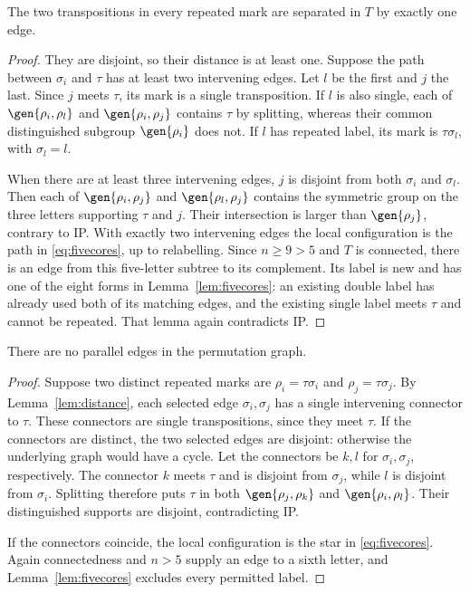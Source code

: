 \begin{lemma}\label{lem:distance}
The two transpositions in every repeated mark are separated in $T$ by
exactly one edge.
\end{lemma}
\begin{proof}
They are disjoint, so their distance is at least one. Suppose the path
between $\sigma_i$ and $\tau$ has at least two intervening edges.
Let $l$ be the first and $j$ the last. Since $j$ meets $\tau$, its
mark is a single transposition. If $l$ is also single, each of
$\gen{\rho_i,\rho_l}$ and $\gen{\rho_i,\rho_j}$ contains $\tau$
by splitting, whereas their common distinguished subgroup
$\gen{\rho_i}$ does not. If $l$ has repeated label, its mark is
$\tau\sigma_l$, with $\sigma_l=l$.

When there are at least three intervening edges, $j$ is disjoint from
both $\sigma_i$ and $\sigma_l$. Then each of
$\gen{\rho_i,\rho_j}$ and $\gen{\rho_l,\rho_j}$ contains the
symmetric group on the three letters supporting $\tau$ and $j$.
Their intersection is larger than $\gen{\rho_j}$, contrary to IP.
With exactly two intervening edges the local configuration is the path
in \eqref{eq:fivecores}, up to relabelling. Since $n\geq9>5$ and $T$ is connected,
there is an edge from this five-letter subtree to its complement.
Its label is new and has one of the eight forms in
Lemma~\ref{lem:fivecores}: an existing double label has already used
both of its matching edges, and the existing single label meets
$\tau$ and cannot be repeated. That lemma again contradicts IP.
\end{proof}

\begin{lemma}\label{lem:parallel}
There are no parallel edges in the permutation graph.
\end{lemma}
\begin{proof}
Suppose two distinct repeated marks are $\rho_i=\tau\sigma_i$ and
$\rho_j=\tau\sigma_j$. By Lemma~\ref{lem:distance}, each selected
edge $\sigma_i,\sigma_j$ has a single intervening connector to $\tau$.
These connectors are single transpositions, since they meet $\tau$.
If the connectors are distinct, the two selected edges are disjoint:
otherwise the underlying graph would have a cycle. Let the connectors
be $k,l$ for $\sigma_i,\sigma_j$, respectively. The connector $k$
meets $\tau$ and is disjoint from $\sigma_j$, while $l$ is disjoint
from $\sigma_i$. Splitting therefore puts $\tau$ in both
$\gen{\rho_j,\rho_k}$ and $\gen{\rho_i,\rho_l}$. Their distinguished
supports are disjoint, contradicting IP.

If the connectors coincide, the local configuration is the star in
\eqref{eq:fivecores}. Again connectedness and $n>5$ supply an edge to a sixth letter,
and Lemma~\ref{lem:fivecores} excludes every permitted label.
\end{proof}

